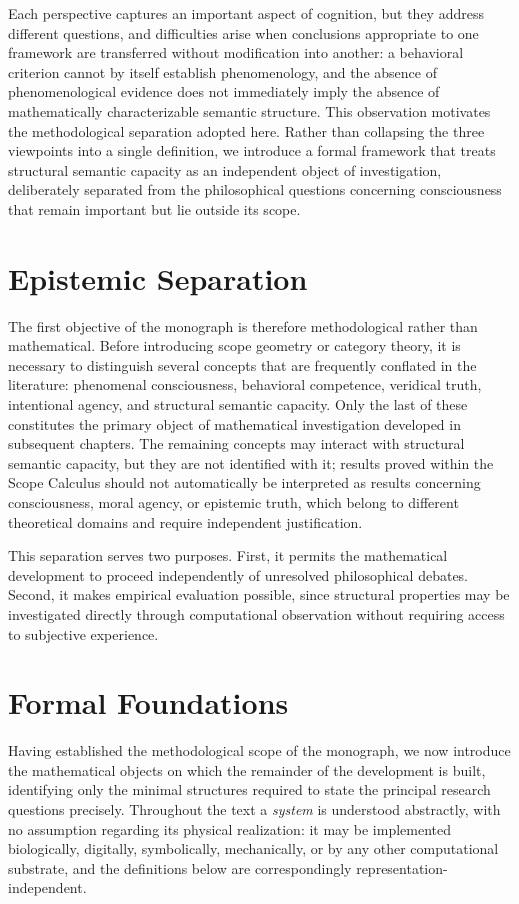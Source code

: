 \documentclass[11pt,twoside,openright]{book}
\numberwithin{equation}{chapter}
\theoremstyle{definition}
\theoremstyle{plain}
\theoremstyle{remark}
\theoremstyle{definition}
\begin{document}
Each perspective captures an important aspect of cognition, but they
address different questions, and difficulties arise when conclusions
appropriate to one framework are transferred without modification into
another: a behavioral criterion cannot by itself establish phenomenology,
and the absence of phenomenological evidence does not immediately imply
the absence of mathematically characterizable semantic structure. This
observation motivates the methodological separation adopted here. Rather
than collapsing the three viewpoints into a single definition, we
introduce a formal framework that treats structural semantic capacity as
an independent object of investigation, deliberately separated from the
philosophical questions concerning consciousness that remain important
but lie outside its scope.

\section{Epistemic Separation}

The first objective of the monograph is therefore methodological rather
than mathematical. Before introducing scope geometry or category theory,
it is necessary to distinguish several concepts that are frequently
conflated in the literature: phenomenal consciousness, behavioral
competence, veridical truth, intentional agency, and structural semantic
capacity. Only the last of these constitutes the primary object of
mathematical investigation developed in subsequent chapters. The
remaining concepts may interact with structural semantic capacity, but
they are not identified with it; results proved within the Scope Calculus
should not automatically be interpreted as results concerning
consciousness, moral agency, or epistemic truth, which belong to
different theoretical domains and require independent justification.

This separation serves two purposes. First, it permits the mathematical
development to proceed independently of unresolved philosophical debates.
Second, it makes empirical evaluation possible, since structural
properties may be investigated directly through computational observation
without requiring access to subjective experience.

\section{Formal Foundations}

Having established the methodological scope of the monograph, we now
introduce the mathematical objects on which the remainder of the
development is built, identifying only the minimal structures required to
state the principal research questions precisely. Throughout the text a
\emph{system} is understood abstractly, with no assumption regarding its
physical realization: it may be implemented biologically, digitally,
symbolically, mechanically, or by any other computational substrate, and
the definitions below are correspondingly representation-independent.
\end{document}
